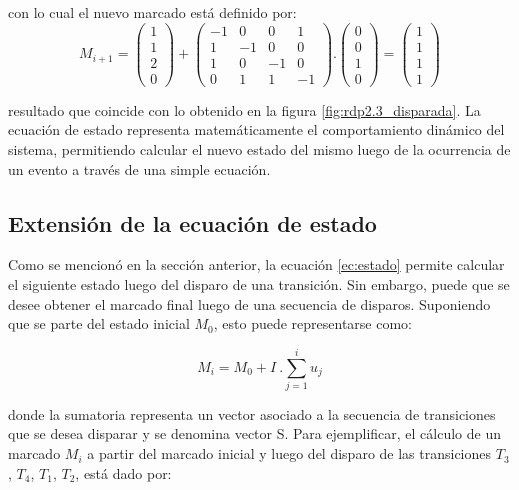 \noindent con lo cual el nuevo marcado está definido por:
\begin{equation}
    M_{i+1} = 
    \begin{pmatrix}
        1 \\
        1 \\
        2 \\
        0
    \end{pmatrix}
    +
    \begin{pmatrix}
        -1 & 0 & 0 & 1 \\
        1 & -1 & 0 & 0 \\
        1 & 0 & -1 & 0 \\
        0 & 1 & 1 & -1 
    \end{pmatrix}
    .
    \begin{pmatrix}
        0 \\
        0 \\
        1 \\
        0
    \end{pmatrix}
    =
    \begin{pmatrix}
        1 \\
        1 \\
        1 \\
        1
    \end{pmatrix}    
\end{equation}

\noindent resultado que coincide con lo obtenido en la figura \ref{fig:rdp2.3_disparada}. La ecuación de estado representa matemáticamente el comportamiento dinámico del sistema, permitiendo calcular el nuevo estado del mismo luego de la ocurrencia de un evento a través de una simple ecuación.

\subsection{Extensión de la ecuación de estado}
Como se mencionó en la sección anterior, la ecuación \ref{ec:estado} permite calcular el siguiente estado luego del disparo de una transición. Sin embargo, puede que se desee obtener el marcado final luego de una secuencia de disparos. Suponiendo que se parte del estado inicial $M_0$, esto puede representarse como:

\begin{equation}
    M_i = M_0 + I \ . \sum_{j=1}^i u_j
\end{equation}

\noindent donde la sumatoria representa un vector asociado a la secuencia de transiciones que se desea disparar y se denomina vector S. Para ejemplificar, el cálculo de un marcado $M_i$ a partir del marcado inicial y luego del disparo de las transiciones {$T_3$, $T_4$, $T_1$, $T_2$,} está dado por:

